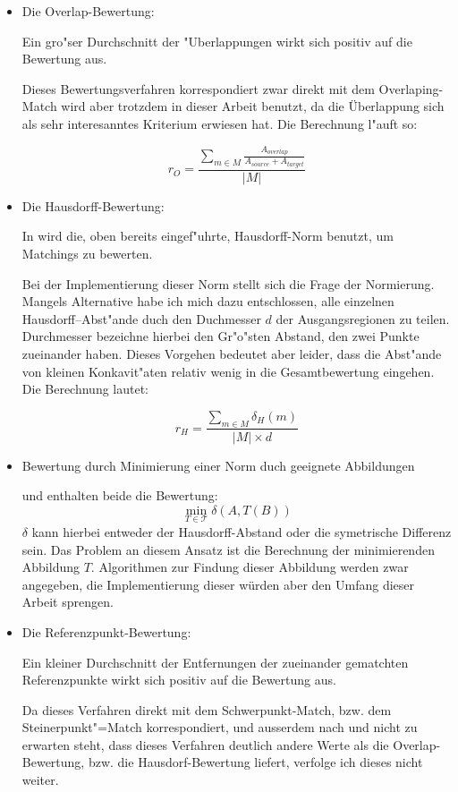 \begin{itemize}
\item Die Overlap-Bewertung: 

Ein gro"ser Durchschnitt der "Uberlappungen wirkt sich positiv auf die Bewertung aus.

Dieses Bewertungsverfahren korrespondiert zwar direkt mit dem Overlaping-Match wird aber trotzdem in dieser Arbeit benutzt, da die Überlappung sich als sehr interesanntes Kriterium erwiesen hat. Die Berechnung l"auft so:

$$r_O=\frac{\sum_{m\in M} \frac{A_{overlap}}{A_{source}+A_{target}}}{|M|}$$

\item Die Hausdorff-Bewertung:

In \cite{AAR} wird die,  oben bereits eingef"uhrte, Hausdorff-Norm benutzt, um Matchings zu bewerten. 

Bei der Implementierung dieser Norm stellt sich die Frage der Normierung. Mangels Alternative habe ich mich dazu entschlossen, alle einzelnen Hausdorff--Abst"ande duch den Duchmesser $d$ der Ausgangsregionen zu teilen.  Durchmesser bezeichne hierbei den Gr"o"sten Abstand, den zwei Punkte zueinander haben. Dieses Vorgehen bedeutet aber leider, dass die Abst"ande von kleinen Konkavit"aten relativ wenig in die Gesamtbewertung eingehen. Die Berechnung lautet:

$$r_H=\frac{\sum_{m\in M}\delta_H(m)}{|M|\times d}$$

\item Bewertung durch Minimierung einer Norm duch geeignete Abbildungen

\cite{AAR} und \cite{AFRW} enthalten beide die Bewertung:
$$\min_{T\in\mathcal{T}}\delta(A,T(B))$$
$\delta$ kann hierbei entweder der Hausdorff-Abstand oder die symetrische Differenz sein. Das Problem an diesem Ansatz ist die Berechnung der minimierenden Abbildung $T$. Algorithmen zur Findung dieser Abbildung werden zwar angegeben, die Implementierung dieser würden aber den Umfang dieser Arbeit sprengen.

\item Die Referenzpunkt-Bewertung:

Ein kleiner Durchschnitt der Entfernungen der zueinander gematchten Referenzpunkte wirkt sich positiv auf die Bewertung aus.

Da dieses Verfahren direkt mit dem Schwerpunkt-Match, bzw. dem Steinerpunkt"=Match korrespondiert, und ausserdem nach \cite{AFRW} und \cite{AAR} nicht zu erwarten steht, dass dieses Verfahren deutlich andere Werte als die Overlap-Bewertung, bzw. die Hausdorf-Bewertung liefert, verfolge ich dieses nicht weiter.


\end{itemize}
